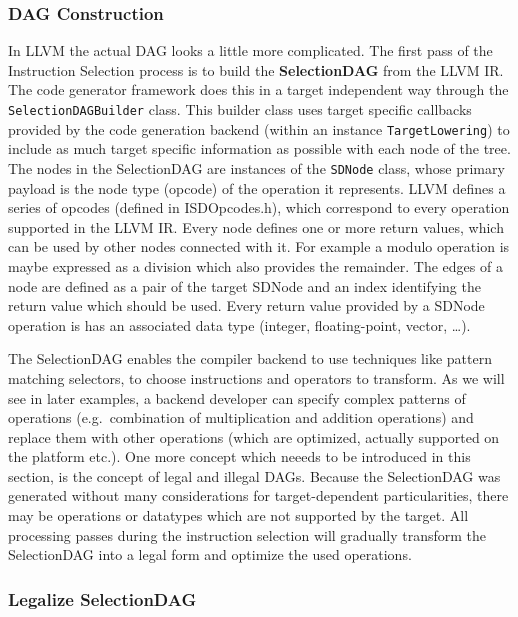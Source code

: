 \subsubsection{DAG Construction}

In LLVM the actual DAG looks a little more complicated. The first pass of the Instruction Selection process is to build 
the \textbf{SelectionDAG} from the LLVM IR. The code generator framework does this in a target independent way through the 
\lstinline[language=c++]{SelectionDAGBuilder} class. This builder class uses target specific callbacks provided by the code generation
backend (within an instance \lstinline[language=c++]{TargetLowering}) to include as much target specific information as possible
with each node of the tree. The nodes in the SelectionDAG are instances of the \lstinline[language=c++]{SDNode} class, whose 
primary payload is the node type (opcode) of the operation it represents. 
LLVM defines a series of opcodes (defined in ISDOpcodes.h), which correspond to every operation  
supported in the LLVM IR. Every node defines one or more return values, which can be used by other nodes
connected with it. For example a modulo operation is maybe expressed as a division which also provides the remainder.
The edges of a node are defined as a pair of the target SDNode and an index identifying the return value which should be used.
Every return value provided by a SDNode operation is has an associated data type (integer, floating-point, vector, \dots).

The SelectionDAG enables the compiler backend to use techniques like pattern matching selectors, to choose instructions and 
operators to transform. As we will see in later examples, a backend developer can specify complex patterns of operations
(e.g.\ combination of multiplication and addition operations) and replace them with other operations (which are optimized,
actually supported on the platform etc.). 
One more concept which neeeds to be introduced in this section, is the concept of legal and illegal DAGs. Because the SelectionDAG
was generated without many considerations for target-dependent particularities, there may be operations or datatypes which are not
supported by the target. All processing passes during the instruction selection will gradually transform the SelectionDAG
into a legal form and optimize the used operations. 

\subsubsection{Legalize SelectionDAG}
\label{subsec:legalize}

